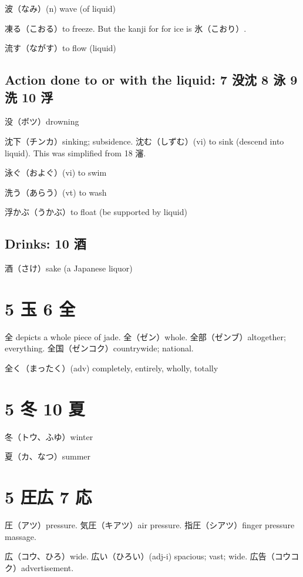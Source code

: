 波（なみ）(n) wave (of liquid)

凍る（こおる）to freeze.
But the kanji for for ice is 氷（こおり）.

流す（ながす）to flow (liquid)

\subsection{Action done to or with the liquid: 7 没沈 8 泳 9 洗 10 浮}

没（ボツ）drowning

沈下（チンカ）sinking; subsidence.
沈む（しずむ）(vi) to sink (descend into liquid).
This was simplified from 18 瀋.

泳ぐ（およぐ）(vi) to swim

洗う（あらう）(vt) to wash

浮かぶ（うかぶ）to float (be supported by liquid)

\subsection{Drinks: 10 酒}

酒（さけ）sake (a Japanese liquor)

\section{5 玉 6 全}

全 depicts a whole piece of jade.
全（ゼン）whole.
全部（ゼンブ）altogether; everything.
全国（ゼンコク）countrywide; national.

全く（まったく）(adv) completely, entirely, wholly, totally

\section{5 冬 10 夏}

冬（トウ、ふゆ）winter

夏（カ、なつ）summer

\section{5 圧広 7 応}

圧（アツ）pressure.
気圧（キアツ）air pressure.
指圧（シアツ）finger pressure massage.

広（コウ、ひろ）wide.
広い（ひろい）(adj-i) spacious; vast; wide.
広告（コウコク）advertisement.

